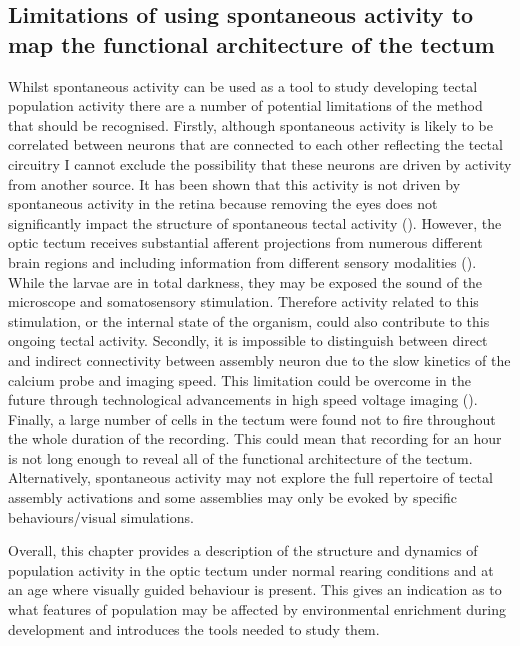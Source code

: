 \subsection{Limitations of using spontaneous activity to map the functional architecture of the tectum}
Whilst spontaneous activity can be used as a tool to study developing tectal population activity there are a number of potential limitations of the method that should be recognised. Firstly, although spontaneous activity is likely to be correlated between neurons that are connected to each other reflecting the tectal circuitry I cannot exclude the possibility that these neurons are driven by activity from another source. It has been shown that this activity is not driven by spontaneous activity in  the retina because removing the eyes does not significantly impact the structure of spontaneous tectal activity (\cite{Romano2015}). However, the optic tectum receives substantial afferent projections from numerous different brain regions and including information from different sensory modalities (\cite{Nevin2010}). While the larvae are in total darkness, they may be exposed the sound of the microscope and somatosensory stimulation.  Therefore activity related to this stimulation, or the internal state of the organism, could also contribute  to this ongoing tectal activity. Secondly,  it is impossible to distinguish between direct and indirect connectivity between assembly neuron due to the slow kinetics of the calcium probe and imaging speed. This limitation could be overcome in the future through technological advancements in high speed voltage imaging (\cite{Abdelfattah2019BrightImaging}).  Finally, a large number of cells in the tectum were found not to fire throughout the whole duration of the recording. This could mean that recording for an hour is not long enough to reveal all of the functional architecture of the tectum. Alternatively, spontaneous activity may not explore the full repertoire of tectal assembly activations and some assemblies may only be evoked by specific behaviours/visual simulations.

Overall, this chapter provides a description of the structure and dynamics of population activity in the optic tectum under normal rearing conditions and at an age where visually guided behaviour is present. This gives an indication as to what features of population may be affected by environmental enrichment during development and introduces the tools needed to study them.  